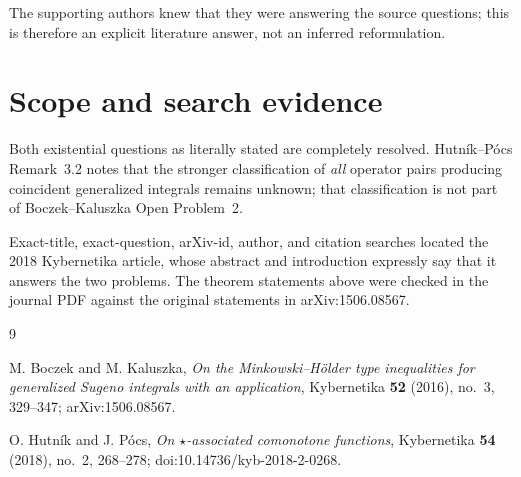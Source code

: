 \documentclass[10pt]{article}
\begin{document}
The supporting authors knew that they were answering the source questions;
this is therefore an explicit literature answer, not an inferred
reformulation.

\section*{Scope and search evidence}

Both existential questions as literally stated are completely resolved.
Hutn\'ik--P\'ocs Remark~3.2 notes that the stronger classification of
\emph{all} operator pairs producing coincident generalized integrals remains
unknown; that classification is not part of Boczek--Kaluszka Open Problem~2.

Exact-title, exact-question, arXiv-id, author, and citation searches located
the 2018 Kybernetika article, whose abstract and introduction expressly say
that it answers the two problems.  The theorem statements above were checked
in the journal PDF against the original statements in arXiv:1506.08567.

\begin{thebibliography}{9}

M. Boczek and M. Kaluszka,
\emph{On the Minkowski--H\"older type inequalities for generalized Sugeno
integrals with an application},
Kybernetika \textbf{52} (2016), no.~3, 329--347;
arXiv:1506.08567.

O. Hutn\'ik and J. P\'ocs,
\emph{On $\star$-associated comonotone functions},
Kybernetika \textbf{54} (2018), no.~2, 268--278;
doi:10.14736/kyb-2018-2-0268.

\end{thebibliography}
\end{document}
